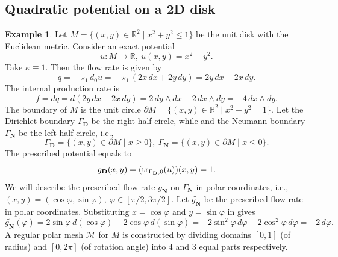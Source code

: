\documentclass{elsarticle}
\theoremstyle{definition}
\newtheorem{example}[theorem]{Example}
\newcommand{\tr}{\mathop{\rm tr}\nolimits}
\newcommand{\R}{\mathbb{R}}
\newcommand{\set}[2]{\{#1 \mid #2\}}
\newcommand{\Dirichlet}{\mathbf{D}}
\newcommand{\Neumann}{\mathbf{N}}
\begin{document}
\subsection{Quadratic potential on a 2D disk}
\label{sec:simulations/disk}

\begin{example}
  Let $M = \set{(x, y) \in \R^2}{x^2 + y^2 \leq 1}$ be the unit disk with the Euclidean metric.
  Consider an exact potential
  \begin{equation}
    u \colon M \to \R,\ u(x, y) = x^2 + y^2.
  \end{equation}
  Take $\kappa \equiv 1$.
  Then the flow rate is given by
  \begin{equation}
    \label{eq:simulations/disk/flow_rate}
    q
    = - \star_1 d_0 u
    = - \star_1(2 x\, d x + 2 y\, d y)
    = 2 y\, d x - 2 x\, d y.
  \end{equation}
  The internal production rate is
  \begin{equation}
    f
    = d q
    = d(2 y\, d x - 2 x\, d y)
    = 2\, d y \wedge d x - 2\, d x \wedge d y
    = - 4\, d x \wedge d y.
  \end{equation}
  The boundary of $M$ is the unit circle $\partial M = \set{(x, y) \in \R^2}{x^2 + y^2 = 1}$.
  Let the Dirichlet boundary $\Gamma_\Dirichlet$ be the right half-circle, while and the Neumann boundary $\Gamma_\Neumann$ be the left half-circle, i.e.,
  \begin{equation}
    \Gamma_\Dirichlet = \set{(x, y) \in \partial M}{x \geq 0},\ \Gamma_\Neumann = \set{(x, y) \in \partial M}{x \leq 0}.
  \end{equation}
  The prescribed potential equals to
  \begin{equation}
    g_\Dirichlet(x, y) = (\tr_{\Gamma_\Dirichlet, 0}(u))(x, y) = 1.
  \end{equation}
  We will describe the prescribed flow rate $g_\Neumann$ on $\Gamma_\Neumann$ in polar coordinates, i.e.,
  $(x, y) = (\cos \varphi, \sin \varphi),\ \varphi \in [\pi / 2, 3 \pi / 2]$.
  Let $\widetilde{g_\Neumann}$ be the prescribed flow rate in polar coordinates.
  Substituting $x = \cos \varphi$ and $y = \sin \varphi$ in  gives
  \begin{equation}
    \widetilde{g_\Neumann}(\varphi)
    = 2 \sin \varphi\, d(\cos \varphi) - 2 \cos \varphi\, d(\sin \varphi)
    = - 2 \sin^2 \varphi\, d \varphi - 2 \cos^2 \varphi\, d \varphi
    = -2\, d \varphi.
  \end{equation}
  A regular polar mesh $\mathcal{M}$ for $M$ is constructed by dividing domains $[0, 1]$ (of radius) and $[0, 2 \pi]$ (of rotation angle) into $4$ and $3$ equal parts respectively.

\end{example}
\end{document}
